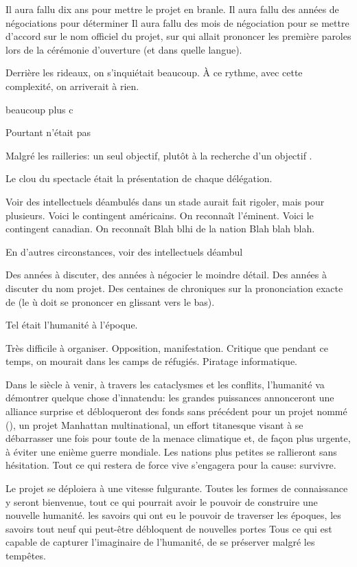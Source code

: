 Il aura fallu dix ans pour mettre le projet en branle.
Il aura fallu des années de négociations pour déterminer
Il aura fallu des mois de négociation pour se mettre d'accord sur le nom officiel du projet, sur qui allait prononcer les première paroles
lors de la cérémonie d'ouverture (et dans quelle langue).

Derrière les rideaux, on s'inquiétait beaucoup.
À ce rythme, avec cette complexité, on arriverait à rien.

beaucoup plus c

Pourtant \nomProjet{} n'était pas 


Malgré les railleries: un seul objectif, plutôt \og à la recherche d'un objectif \fg.





Le clou du spectacle était la présentation de chaque délégation.



Voir des intellectuels déambulés dans un stade aurait fait rigoler, mais pour
plusieurs. Voici le contingent américains. On reconnaît l'éminent.
Voici le contingent canadian. 
On reconnaît Blah blhi de la nation Blah blah blah.

En d'autres circonstances, 
voir des intellectuels déambul

Des années à discuter, des années à négocier le moindre détail. 
Des années à discuter du nom projet. Des centaines de chroniques
sur la prononciation exacte de \nomProjet{} (le \og ù \fg doit se prononcer en glissant vers le bas).

Tel était l'humanité à l'époque.

Très difficile à organiser.  Opposition, manifestation. Critique que pendant ce
temps, on mourait dans les camps de réfugiés.
Piratage informatique.


Dans le siècle à venir, à travers les cataclysmes et les conflits, l'humanité
va démontrer quelque chose d'innatendu: les grandes puissances annonceront une
alliance surprise et débloqueront des fonds sans précédent pour un projet nommé
\textit{\nomProjet{}} (\nomProjetEn{}), un projet Manhattan multinational, un
effort titanesque visant à se débarrasser une fois pour toute de la menace
climatique et, de façon plus urgente, à éviter une enième guerre mondiale.  Les
nations plus petites se rallieront sans hésitation.  Tout ce qui restera de
force vive s'engagera pour la cause: survivre.

Le projet \nomProjet{} se déploiera à une vitesse fulgurante.  Toutes les
formes de connaissance y seront bienvenue, tout ce qui pourrait avoir le
pouvoir de construire une nouvelle humanité.  les savoirs qui ont eu le pouvoir
de traverser les époques, les savoirs tout neuf qui peut-être débloquent de
nouvelles portes Tous ce qui est capable de capturer l'imaginaire de
l'humanité, de se préserver malgré les tempêtes.




